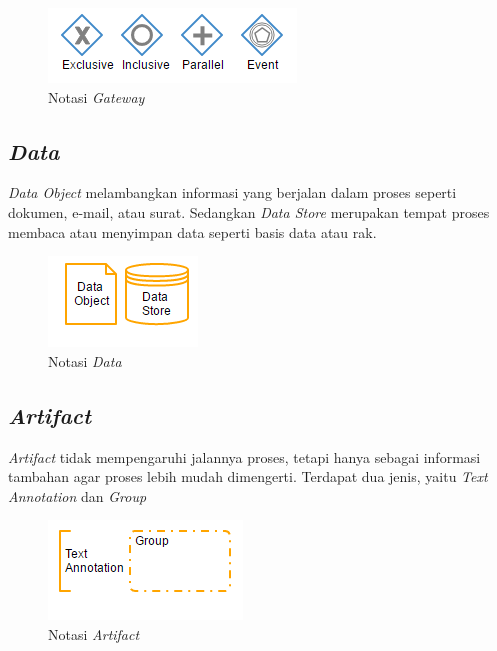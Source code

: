 \begin{figure}[H]
	\centering
	\includegraphics[scale=1]{Gambar/Bab-2/bpmn/gateway}
	\caption{Notasi \textit{Gateway}} 
	\label{gateway}
\end{figure}




\subsection{\textit{Data}}
\label{sec:data}
\textit{Data Object} melambangkan informasi yang berjalan dalam proses seperti dokumen, e-mail, atau surat. Sedangkan \textit{Data Store} merupakan tempat proses membaca atau menyimpan data seperti basis data atau rak. 
\begin{figure}[H]
	\centering
	\includegraphics[scale=1]{Gambar/Bab-2/bpmn/data}
	\caption{Notasi \textit{Data}} 
	\label{data}
\end{figure}


\subsection{\textit{Artifact}}
\label{sec:artifacts}
\textit{Artifact} tidak mempengaruhi jalannya proses, tetapi hanya sebagai informasi tambahan agar proses lebih mudah dimengerti. Terdapat dua jenis, yaitu \textit{Text Annotation} dan \textit{Group}
\begin{figure}[H]
	\centering
	\includegraphics[scale=1]{Gambar/Bab-2/bpmn/artifact}
	\caption{Notasi \textit{Artifact} }
	\label{artifact}
\end{figure}


